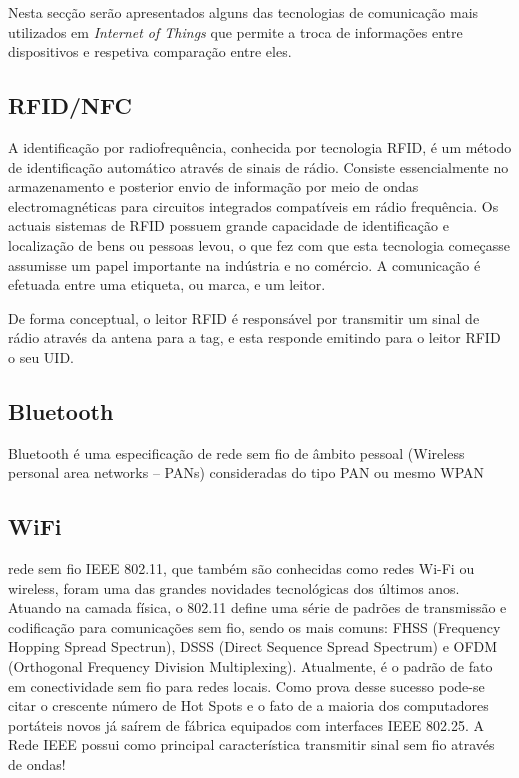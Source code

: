 Nesta secção serão apresentados alguns das tecnologias de comunicação mais utilizados em \textit{Internet of Things} que permite a troca de informações entre dispositivos e respetiva comparação entre eles. 
 

 
\subsection{RFID/NFC}

A identificação por radiofrequência, conhecida por tecnologia \ac{RFID}, é um método de identificação automático através de sinais de rádio. Consiste essencialmente no armazenamento e posterior envio de informação por meio de ondas electromagnéticas para circuitos integrados compatíveis em rádio frequência.  
Os actuais sistemas de \ac{RFID} possuem grande capacidade de identificação e localização de bens ou pessoas levou, o que fez com que esta tecnologia começasse assumisse um papel importante na indústria e no comércio. A comunicação é efetuada entre uma etiqueta, ou marca, e um leitor.


De forma conceptual, o leitor \ac{RFID} é responsável por transmitir um sinal de rádio através da antena para a tag, e esta responde emitindo para o leitor \ac{RFID} o seu \ac{UID}.


\subsection{Bluetooth}

Bluetooth é uma especificação de rede sem fio de âmbito pessoal (Wireless personal area networks – PANs) consideradas do tipo PAN ou mesmo WPAN


\subsection{WiFi}

rede sem fio IEEE 802.11, que também são conhecidas como redes Wi-Fi ou wireless, foram uma das grandes novidades tecnológicas dos últimos anos. Atuando na camada física, o 802.11 define uma série de padrões de transmissão e codificação para comunicações sem fio, sendo os mais comuns: FHSS (Frequency Hopping Spread Spectrun), DSSS (Direct Sequence Spread Spectrum) e OFDM (Orthogonal Frequency Division Multiplexing). Atualmente, é o padrão de fato em conectividade sem fio para redes locais. Como prova desse sucesso pode-se citar o crescente número de Hot Spots e o fato de a maioria dos computadores portáteis novos já saírem de fábrica equipados com interfaces IEEE 802.25. A Rede IEEE possui como principal característica transmitir sinal sem fio através de ondas!



